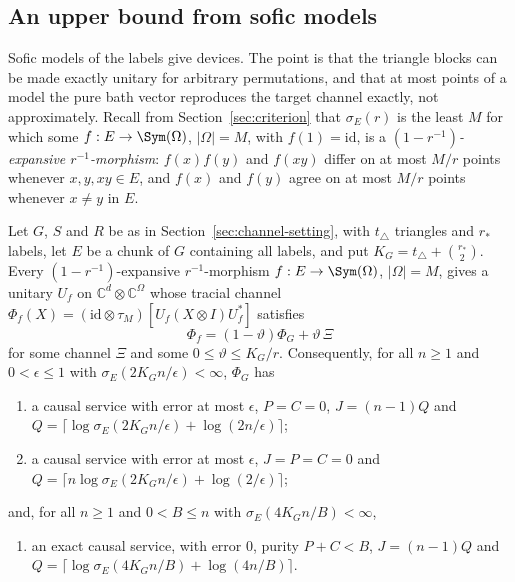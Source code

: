 \subsection{An upper bound from sofic models}\label{sec:sofic-upper}

Sofic models of the labels give devices. The point is that the triangle blocks can be made exactly unitary for arbitrary permutations, and that at
most points of a model the pure bath vector reproduces the target channel exactly, not approximately. Recall from Section~\ref{sec:criterion}
that $\sigma_E(r)$ is the least $M$ for which some $f:E\to\Sym(\Omega)$, $|\Omega|=M$, with $f(1)=\mathrm{id}$, is a
\emph{$(1-r^{-1})$-expansive $r^{-1}$-morphism}: $f(x)f(y)$ and $f(xy)$ differ on at most $M/r$ points whenever $x,y,xy\in E$, and $f(x)$ and
$f(y)$ agree on at most $M/r$ points whenever $x\ne y$ in $E$.

\begin{proposition}\label{prop:sofic-upper}
Let $G$, $S$ and $R$ be as in Section~\ref{sec:channel-setting}, with $t_\triangle$ triangles and $r_*$ labels, let $E$ be a chunk of $G$ containing
all labels, and put $K_G=t_\triangle+\binom{r_*}2$. Every $(1-r^{-1})$-expansive $r^{-1}$-morphism $f:E\to\Sym(\Omega)$, $|\Omega|=M$, gives a unitary $U_f$ on
$\mathbb C^d\otimes\mathbb C^\Omega$ whose tracial channel $\Phi_f(X)=(\mathrm{id}\otimes\tau_M)[U_f(X\otimes I)U_f^*]$ satisfies
\[
\Phi_f=(1-\vartheta)\Phi_G+\vartheta\,\Xi
\]
for some channel $\Xi$ and some $0\le\vartheta\le K_G/r$. Consequently, for all $n\ge1$ and $0<\epsilon\le1$ with $\sigma_E(2K_Gn/\epsilon)<\infty$,
$\Phi_G$ has
\begin{enumerate}[label=(\alph*),itemsep=1pt]
\item a causal service with error at most $\epsilon$, $P=C=0$, $J=(n-1)Q$ and $Q=\bigl\lceil\log\sigma_E(2K_Gn/\epsilon)+\log(2n/\epsilon)\bigr\rceil$;
\item a causal service with error at most $\epsilon$, $J=P=C=0$ and $Q=\bigl\lceil n\log\sigma_E(2K_Gn/\epsilon)+\log(2/\epsilon)\bigr\rceil$;
\end{enumerate}
and, for all $n\ge1$ and $0<B\le n$ with $\sigma_E(4K_Gn/B)<\infty$,
\begin{enumerate}[label=(\alph*),itemsep=1pt,resume]
\item an exact causal service, with error $0$, purity $P+C<B$, $J=(n-1)Q$ and $Q=\bigl\lceil\log\sigma_E(4K_Gn/B)+\log(4n/B)\bigr\rceil$.
\end{enumerate}
\end{proposition}

